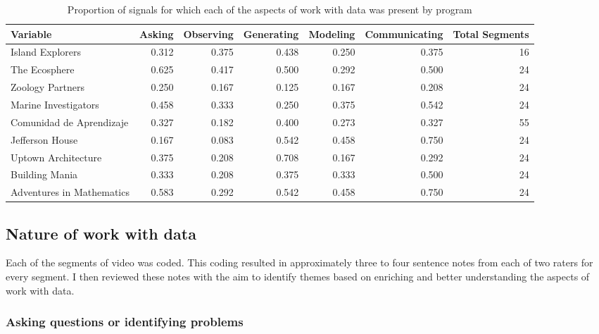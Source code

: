\documentclass[]{msu-thesis}
\theoremstyle{definition}
\theoremstyle{definition}
\theoremstyle{definition}
\theoremstyle{remark}
\begin{document}
\begin{landscape}\begin{table}

\caption{\label{tab:unnamed-chunk-9}Proportion of signals for which each of the aspects of work with data was present by program}
\centering
\begin{tabular}[t]{lrrrrrr}
\toprule
Variable & Asking & Observing & Generating & Modeling & Communicating & Total Segments\\
\midrule
Island Explorers & 0.312 & 0.375 & 0.438 & 0.250 & 0.375 & 16\\
The Ecosphere & 0.625 & 0.417 & 0.500 & 0.292 & 0.500 & 24\\
Zoology Partners & 0.250 & 0.167 & 0.125 & 0.167 & 0.208 & 24\\
Marine Investigators & 0.458 & 0.333 & 0.250 & 0.375 & 0.542 & 24\\
Comunidad de Aprendizaje & 0.327 & 0.182 & 0.400 & 0.273 & 0.327 & 55\\
Jefferson House & 0.167 & 0.083 & 0.542 & 0.458 & 0.750 & 24\\
Uptown Architecture & 0.375 & 0.208 & 0.708 & 0.167 & 0.292 & 24\\
Building Mania & 0.333 & 0.208 & 0.375 & 0.333 & 0.500 & 24\\
Adventures in Mathematics & 0.583 & 0.292 & 0.542 & 0.458 & 0.750 & 24\\
\bottomrule
\end{tabular}
\end{table}
\end{landscape}

\subsection{Nature of work with data}\label{nature-of-work-with-data}

Each of the segments of video was coded. This coding resulted in
approximately three to four sentence notes from each of two raters for
every segment. I then reviewed these notes with the aim to identify
themes based on enriching and better understanding the aspects of work
with data.

\subsubsection{Asking questions or identifying
problems}\label{asking-questions-or-identifying-problems}
\end{document}
